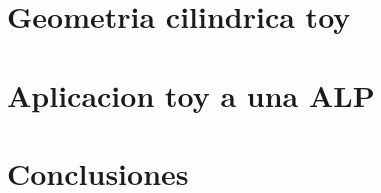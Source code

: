 \documentclass[11pt]{article}
\begin{document}
\section{Geometria cilindrica toy}


\section{Aplicacion toy a una ALP}


\section{Conclusiones}




\end{document}
